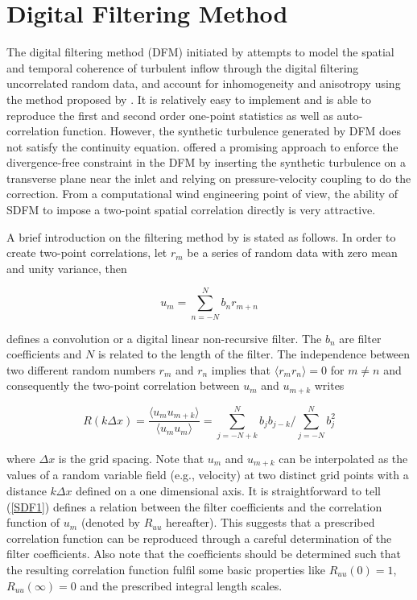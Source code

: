 \section{Digital Filtering Method} \label{sectionDFM}

The digital filtering method (DFM) initiated by \cite{klein2003} attempts to model the spatial and temporal coherence of turbulent inflow through the digital filtering uncorrelated random data, and account for inhomogeneity and anisotropy using the method proposed by \cite{lund1998}. It is relatively easy to implement and is able to reproduce the first and second order one-point statistics as well as auto-correlation function. However, the synthetic turbulence generated by DFM does not satisfy the continuity equation. \cite{kim2013} offered a promising approach to enforce the divergence-free constraint in the DFM by inserting the synthetic turbulence on a transverse plane near the inlet and relying on pressure-velocity coupling to do the correction. From a computational wind engineering point of view, the ability of SDFM to impose a two-point spatial correlation directly is very attractive.

A brief introduction on the filtering method by \cite{klein2003} is stated as follows. In order to create two-point correlations, let $r_m$ be a series of random data with zero mean and unity variance, then

\begin{equation}
u_m = \sum_{n=-N}^N b_n r_{m+n}
\end{equation}

\noindent defines a convolution or a digital linear non-recursive filter. The $b_n$ are filter coefficients and $N$ is related to the length of the filter. The independence between two different random numbers $r_m$ and $r_n$ implies that $\langle r_m r_n \rangle = 0$ for $m \neq n$ and consequently the two-point correlation between $u_{m}$ and $u_{m+k}$ writes

\begin{equation} \label{SDF1}
R(k\Delta x) = \frac{\langle u_{m} u_{m+k} \rangle}{\langle u_{m} u_{m} \rangle} = \sum_{j=-N+k}^N b_j b_{j-k} / \sum_{j=-N}^N b_j^2
\end{equation}

\noindent where $\Delta x$ is the grid spacing. Note that $u_{m}$ and $u_{m+k}$ can be interpolated as the values of a random variable field (e.g., velocity) at two distinct grid points with a distance $k\Delta x$ defined on a one dimensional axis. It is straightforward to tell (\ref{SDF1}) defines a relation between the filter coefficients and the correlation function of $u_m$ (denoted by $R_{uu}$ hereafter). This suggests that a prescribed correlation function can be reproduced through a careful determination of the filter coefficients. Also note that the coefficients should be determined such that the resulting correlation function fulfil some basic properties like $R_{uu}(0)=1$, $R_{uu}(\infty) = 0$ and the prescribed integral length scales.

